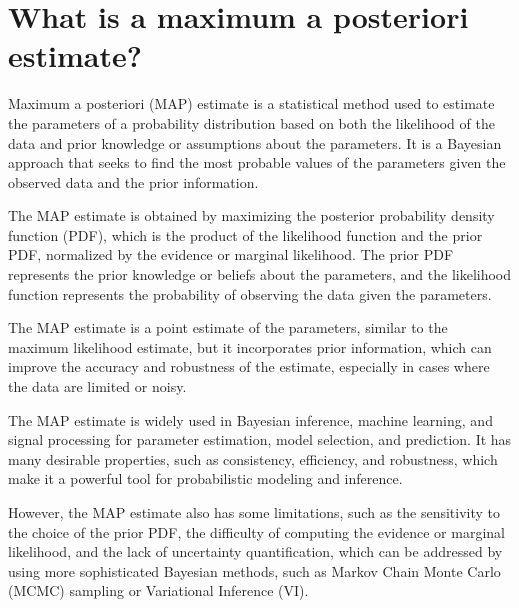 \section{What is a maximum a posteriori estimate?}
Maximum a posteriori (MAP) estimate is a statistical method used to estimate the parameters of a probability distribution based on both the likelihood of the data and prior knowledge or assumptions about the parameters. It is a Bayesian approach that seeks to find the most probable values of the parameters given the observed data and the prior information.

The MAP estimate is obtained by maximizing the posterior probability density function (PDF), which is the product of the likelihood function and the prior PDF, normalized by the evidence or marginal likelihood. The prior PDF represents the prior knowledge or beliefs about the parameters, and the likelihood function represents the probability of observing the data given the parameters.

The MAP estimate is a point estimate of the parameters, similar to the maximum likelihood estimate, but it incorporates prior information, which can improve the accuracy and robustness of the estimate, especially in cases where the data are limited or noisy.

The MAP estimate is widely used in Bayesian inference, machine learning, and signal processing for parameter estimation, model selection, and prediction. It has many desirable properties, such as consistency, efficiency, and robustness, which make it a powerful tool for probabilistic modeling and inference.

However, the MAP estimate also has some limitations, such as the sensitivity to the choice of the prior PDF, the difficulty of computing the evidence or marginal likelihood, and the lack of uncertainty quantification, which can be addressed by using more sophisticated Bayesian methods, such as Markov Chain Monte Carlo (MCMC) sampling or Variational Inference (VI).


